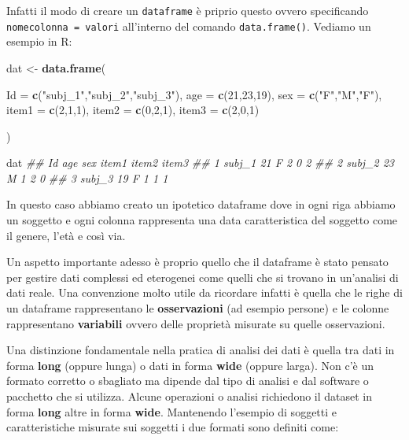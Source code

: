 \documentclass[
]{book}
\newenvironment{Shaded}{\begin{snugshade}}{\end{snugshade}}
\newcommand{\CommentTok}[1]{\textcolor[rgb]{0.56,0.35,0.01}{\textit{#1}}}
\newcommand{\DataTypeTok}[1]{\textcolor[rgb]{0.13,0.29,0.53}{#1}}
\newcommand{\DecValTok}[1]{\textcolor[rgb]{0.00,0.00,0.81}{#1}}
\newcommand{\KeywordTok}[1]{\textcolor[rgb]{0.13,0.29,0.53}{\textbf{#1}}}
\newcommand{\NormalTok}[1]{#1}
\newcommand{\StringTok}[1]{\textcolor[rgb]{0.31,0.60,0.02}{#1}}
\begin{document}
Infatti il modo di creare un \texttt{dataframe} è priprio questo ovvero specificando \texttt{nomecolonna\ =\ valori} all'interno del comando \texttt{data.frame()}. Vediamo un esempio in R:

\begin{Shaded}
\begin{Highlighting}[]

\NormalTok{dat <-}\StringTok{ }\KeywordTok{data.frame}\NormalTok{(}
  
  \DataTypeTok{Id =} \KeywordTok{c}\NormalTok{(}\StringTok{"subj_1"}\NormalTok{,}\StringTok{"subj_2"}\NormalTok{,}\StringTok{"subj_3"}\NormalTok{),}
  \DataTypeTok{age =} \KeywordTok{c}\NormalTok{(}\DecValTok{21}\NormalTok{,}\DecValTok{23}\NormalTok{,}\DecValTok{19}\NormalTok{),}
  \DataTypeTok{sex =} \KeywordTok{c}\NormalTok{(}\StringTok{"F"}\NormalTok{,}\StringTok{"M"}\NormalTok{,}\StringTok{"F"}\NormalTok{),}
  \DataTypeTok{item1 =} \KeywordTok{c}\NormalTok{(}\DecValTok{2}\NormalTok{,}\DecValTok{1}\NormalTok{,}\DecValTok{1}\NormalTok{),}
  \DataTypeTok{item2 =} \KeywordTok{c}\NormalTok{(}\DecValTok{0}\NormalTok{,}\DecValTok{2}\NormalTok{,}\DecValTok{1}\NormalTok{),}
  \DataTypeTok{item3 =} \KeywordTok{c}\NormalTok{(}\DecValTok{2}\NormalTok{,}\DecValTok{0}\NormalTok{,}\DecValTok{1}\NormalTok{)}
  
\NormalTok{)}

\NormalTok{dat}
\CommentTok{##       Id age sex item1 item2 item3}
\CommentTok{## 1 subj_1  21   F     2     0     2}
\CommentTok{## 2 subj_2  23   M     1     2     0}
\CommentTok{## 3 subj_3  19   F     1     1     1}
\end{Highlighting}
\end{Shaded}

In questo caso abbiamo creato un ipotetico dataframe dove in ogni riga abbiamo un soggetto e ogni colonna rappresenta una data caratteristica del soggetto come il genere, l'età e così via.

Un aspetto importante adesso è proprio quello che il dataframe è stato pensato per gestire dati complessi ed eterogenei come quelli che si trovano in un'analisi di dati reale. Una convenzione molto utile da ricordare infatti è quella che le righe di un dataframe rappresentano le \textbf{osservazioni} (ad esempio persone) e le colonne rappresentano \textbf{variabili} ovvero delle proprietà misurate su quelle osservazioni.

Una distinzione fondamentale nella pratica di analisi dei dati è quella tra dati in forma \textbf{long} (oppure lunga) o dati in forma \textbf{wide} (oppure larga). Non c'è un formato corretto o sbagliato ma dipende dal tipo di analisi e dal software o pacchetto che si utilizza. Alcune operazioni o analisi richiedono il dataset in forma \textbf{long} altre in forma \textbf{wide}. Mantenendo l'esempio di soggetti e caratteristiche misurate sui soggetti i due formati sono definiti come:
\end{document}
